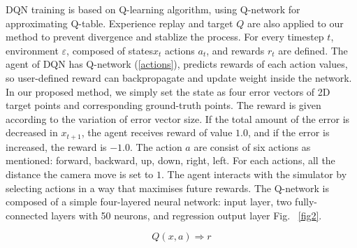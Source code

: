 \documentclass[10pt]{article}
\begin{document}
DQN training is based on Q-learning\cite{ref1} algorithm, using Q-network for approximating Q-table. Experience replay and target $Q$ are also applied to our method to prevent divergence and  stablize the process. For every timestep $t$, environment $\varepsilon$, composed of states$x_t$ actions $a_t$, and rewards $r_t$ are defined. The agent of DQN has Q-network (\ref{actions}), predicts rewards of each action values, so user-defined reward can backpropagate and update weight inside the network\cite{ref2}. In our proposed method, we simply set the state as four error vectors of 2D target points and corresponding ground-truth points. The reward is given according to the variation of error vector size. If the total amount of the error is decreased in $x_{t+1}$, the agent receives reward of value $1.0$, and if the error is increased, the reward is $-1.0$.  The action $a$ are consist of six actions as mentioned: forward, backward, up, down, right, left. For each actions, all the distance the camera move is set to $1$. The agent interacts with the simulator by selecting actions in a way that maximises future rewards. The Q-network is composed of a simple four-layered neural network: input layer, two fully-connected layers with 50 neurons, and regression output layer Fig. ~\ref{fig2}.

\begin{equation}\label{actions}
  Q(x, a) \Rightarrow r
\end{equation}
\end{document}

